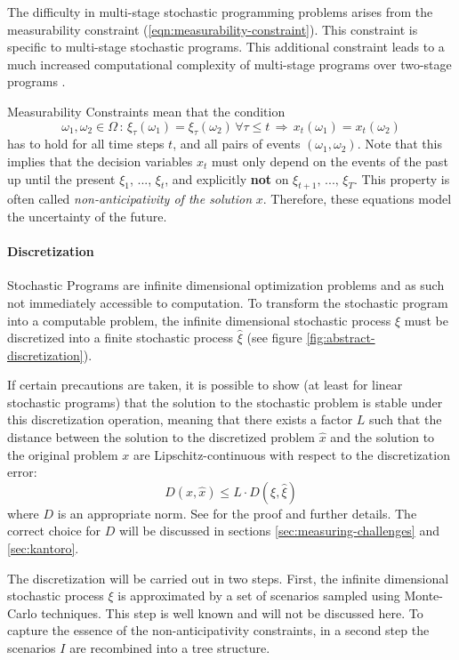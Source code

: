 The difficulty in multi-stage stochastic programming problems arises from the measurability constraint (\ref{eqn:measurability-constraint}). This constraint is specific to multi-stage stochastic programs.
This additional constraint leads to a much increased computational complexity of multi-stage programs over two-stage programs \cite{Shapiro2005,Shapiro2008}.
% 
\par{Measurability Constraints} 
mean that the condition
\begin{equation}
  \label{eq:mathematical-NAC}
  \omega_1,\omega_2\in \Omega \, : \, \xi_\tau(\omega_1) = \xi_\tau(\omega_2)\,\forall \tau\leq t\,\Rightarrow \, x_t(\omega_1) = x_t(\omega_2) 
\end{equation}
has to hold for all time steps $t$, and all pairs of events $(\omega_1,\omega_2)$. 
Note that this implies that the decision variables $x_t$ must only depend on the events of the past up until the present $\xi_1$, ..., $\xi_t$, and explicitly \textbf{not} on $\xi_{t+1},\, ...,\,\xi_T$. 
This property is often called \textit{non-anticipativity of the solution} $x$. 
Therefore, these equations model the uncertainty of the future.
% 
\paragraph{Discretization}
% 
Stochastic Programs are infinite dimensional optimization problems and as such not immediately accessible to computation.
To transform the stochastic program into a computable problem, the infinite dimensional stochastic process $\xi$ must be discretized into a finite stochastic process $\hat{\xi}$ (see figure \ref{fig:abstract-discretization}). 

If certain precautions are taken, it is possible to show (at least for linear stochastic programs) that the solution to the stochastic problem is stable under this discretization operation, meaning that there exists a factor $L$ such that the distance between the solution to the discretized problem $\hat{x}$ and the solution to the original problem $x$ are Lipschitz-continuous with respect to the discretization error:
\begin{equation}
  D(x , \hat{x}) \leq L\cdot D(\xi,\hat{\xi})
\end{equation}
where $D$ is an appropriate norm. See \cite{Heitsch2010} for the proof and further details. The correct choice for $D$ will be discussed in sections \ref{sec:measuring-challenges} and \ref{sec:kantoro}.

The discretization will be carried out in two steps. 
First, the infinite dimensional stochastic process $\xi$ is approximated by a set of scenarios sampled using Monte-Carlo techniques. 
This step is well known and will not be discussed here. 
To capture the essence of the non-anticipativity constraints, in a second step the scenarios $I$ are recombined into a tree structure. 

